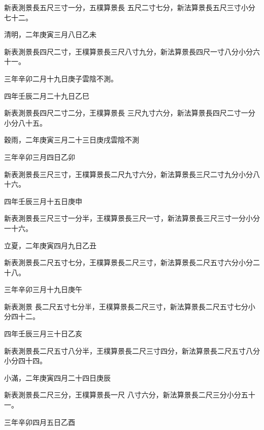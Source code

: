 \begin{pinyinscope}
 新表測景長五尺三寸一分，五樸算景長
 五尺二寸七分，新法算景長五尺三寸小分七十二。



 清明，二年庚寅三月八日乙未



 新表測景長四尺二寸，王樸算景長三尺八寸九分，新法算景長四尺一寸八分小分六十一。



 三年辛卯二月十九日庚子雲陰不測。



 四年壬辰二月二十九日乙巳



 新表測景長四尺二寸二分，王樸算景長
 三尺九寸六分，新法算景長四尺二寸一分小分八十五。



 穀雨，二年庚寅三月二十三日庚戌雲陰不測



 三年辛卯三月四日乙卯



 新表測景長三尺三寸，王樸算景長二尺九寸六分，新法算景長三尺二寸九分小分八十六。



 四年壬辰三月十五日庚申



 新表測景長三尺三寸一分半，王樸算景長三尺一寸，新法算景長三尺三寸一分小分一十六。



 立夏，二年庚寅四月九日乙丑



 新表測景長二尺五寸七分，王樸算景長二尺三寸，新法算景長二尺五寸六分小分二十八。



 三年辛卯三月十九日庚午



 新表測景
 長二尺五寸七分半，王樸算景長二尺三寸，新法算景長二尺五寸七分小分四十二。



 四年壬辰三月三十日乙亥



 新表測景長二尺五寸八分半，王樸算景長二尺三寸四分，新法算景長二尺五寸八分小分四十四。



 小滿，二年庚寅四月二十四日庚辰



 新表測景長二尺三分，王樸算景長一尺
 八寸六分，新法算景長二尺三分小分五十一。



 三年辛卯四月五日乙酉




\end{pinyinscope}
